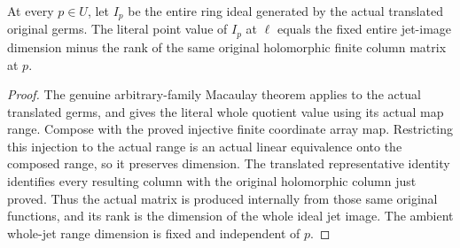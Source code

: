 \begin{theorem}
\label{hir:actual-translated-point-quotient-macaulay-rank}
\leanok
{}
At every $p\in U$, let $I_p$ be the entire ring ideal generated by the
actual translated original germs. The literal point value of $I_p$ at
$\ell$ equals the fixed entire jet-image dimension minus the rank of the
same original holomorphic finite column matrix at $p$.
\end{theorem}
\begin{proof}
The genuine arbitrary-family Macaulay theorem applies to the actual
translated germs, and gives the literal whole quotient value using its
actual map range. Compose with the proved injective finite coordinate
array map. Restricting this injection to the actual range is an actual
linear equivalence onto the composed range, so it preserves dimension.
The translated representative identity identifies every resulting column
with the original holomorphic column just proved. Thus the actual matrix
is produced internally from those same original functions, and its rank
is the dimension of the whole ideal jet image. The ambient whole-jet
range dimension is fixed and independent of $p$.
\end{proof}

